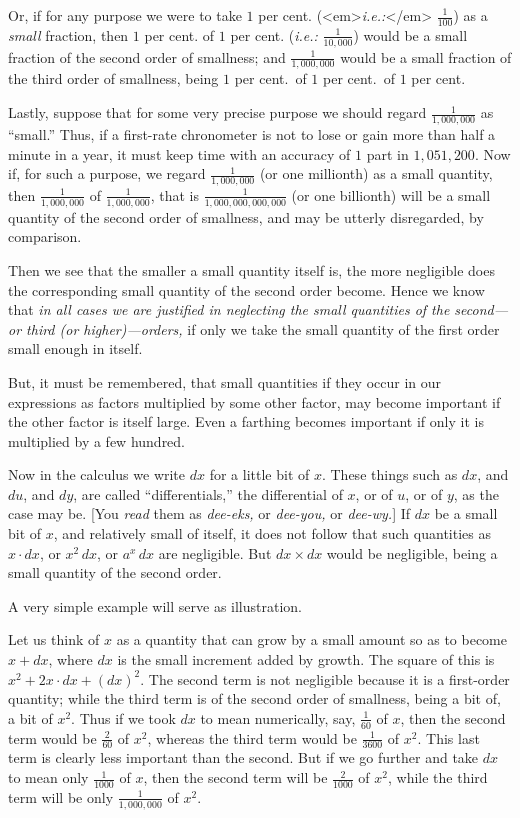 \documentclass{ximera}
\begin{document}
Or, if for any purpose we were to take $1$ per
cent. (<em>\textit{i.e.:}</em> $\frac{1}{100}$) as a \textit{small}
fraction, then $1$ per cent. of $1$ per cent. (\textit{i.e.:}
$\frac{1}{10,000}$) would be a small fraction of the second order of
smallness; and $\frac{1}{1,000,000}$ would be a small fraction of the
third order of smallness, being $1$ per cent.\ of $1$ per cent.\ of
$1$ per cent.

Lastly, suppose that for some very precise purpose we should regard
$\frac{1}{1,000,000}$ as ``small.'' Thus, if a first-rate chronometer
is not to lose or gain more than half a minute in a year, it must keep
time with an accuracy of $1$ part in $1,051,200$. Now if, for such a
purpose, we regard $\frac{1}{1,000,000}$ (or one millionth) as a small
quantity, then $\frac{1}{1,000,000}$ of $\frac{1}{1,000,000}$, that is
$\frac{1}{1,000,000,000,000}$ (or one billionth) will be a small
quantity of the second order of smallness, and may be utterly
disregarded, by comparison.

Then we see that the smaller a small quantity itself is, the more
negligible does the corresponding small quantity of the second order
become. Hence we know that \textit{in all cases we are justified in
neglecting the small quantities of the second---or third (or
higher)---orders,} if only we take the small quantity of the first
order small enough in itself.

But, it must be remembered, that small quantities if they occur in our
expressions as factors multiplied by some other factor, may become
important if the other factor is itself large. Even a farthing becomes
important if only it is multiplied by a few hundred.

Now in the calculus we write $dx$ for a little bit of $x$. These
things such as $dx$, and $du$, and $dy$, are called “differentials,”
the differential of $x$, or of $u$, or of $y$, as the case may
be. [You \textit{read} them as \textit{dee-eks,} or \textit{dee-you,}
  or \textit{dee-wy.}] If $dx$ be a small bit of $x$, and relatively
small of itself, it does not follow that such quantities as $x\cdot
dx$, or $x^2\, dx$, or $a^x\, dx$ are negligible. But $dx \times dx$
would be negligible, being a small quantity of the second order.

A very simple example will serve as illustration.

Let us think of $x$ as a quantity that can grow by a small amount so
as to become $x + dx$, where $dx$ is the small increment added by
growth. The square of this is $x^2 + 2x · dx + (dx)^2$. The second
term is not negligible because it is a first-order quantity; while the
third term is of the second order of smallness, being a bit of, a bit
of $x^2$. Thus if we took $dx$ to mean numerically, say,
$\frac{1}{60}$ of $x$, then the second term would be $\frac{2}{60}$ of
$x^2$, whereas the third term would be $\frac{1}{3600}$ of $x^2$. This
last term is clearly less important than the second. But if we go
further and take $dx$ to mean only $\frac{1}{1000}$ of $x$, then the
second term will be $\frac{2}{1000}$ of $x^2$, while the third term
will be only $\frac{1}{1,000,000}$ of $x^2$.
\end{document}
